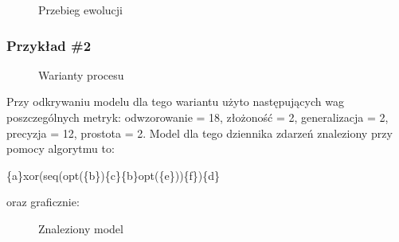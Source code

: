 \begin{figure}[!ht]
	\caption{\label{fig:flow_chart}Przebieg ewolucji}
\end{figure}

\subsubsection{Przykład \#2}
\begin{figure}[!ht]
	\caption{\label{fig:flow_chart}Warianty procesu}
\end{figure}

Przy odkrywaniu modelu dla tego wariantu użyto następujących wag poszczególnych metryk: odwzorowanie = 18, złożoność = 2, generalizacja = 2, precyzja = 12, prostota = 2. Model dla tego dziennika zdarzeń znaleziony przy pomocy algorytmu to:
\begin{center}
	\{a\}xor(seq(opt(\{b\})\{c\}\{b\}opt(\{e\}))\{f\})\{d\}
\end{center}
oraz graficznie:

\begin{figure}[!ht]
	\caption{\label{fig:flow_chart}Znaleziony model}
\end{figure}

